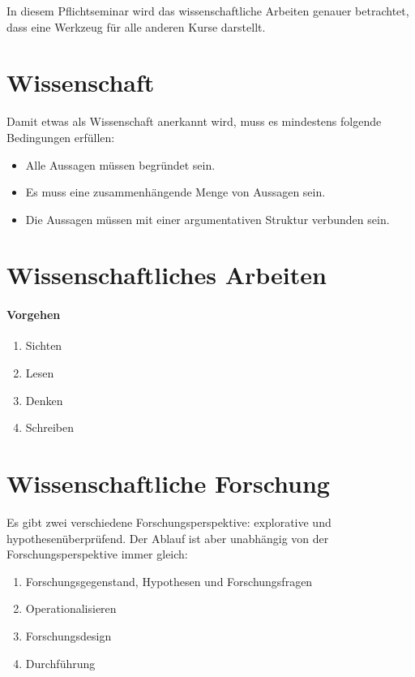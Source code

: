 \documentclass[../main.tex]{subfiles}
\begin{document}
    In diesem Pflichtseminar wird das wissenschaftliche Arbeiten genauer betrachtet, dass eine Werkzeug für alle anderen Kurse darstellt.
    \clearpage

    \section{Wissenschaft}
        Damit etwas als Wissenschaft anerkannt wird, muss es mindestens folgende Bedingungen erfüllen:
        
        \begin{itemize}
            \item Alle Aussagen müssen begründet sein.
            \item Es muss eine zusammenhängende Menge von Aussagen sein.
            \item Die Aussagen müssen mit einer argumentativen Struktur verbunden sein.
        \end{itemize}
        
    \section{Wissenschaftliches Arbeiten}
    
        \paragraph{Vorgehen}
        \begin{enumerate}
            \item Sichten
            \item Lesen
            \item Denken
            \item Schreiben
        \end{enumerate}
        
    \section{Wissenschaftliche Forschung}
        Es gibt zwei verschiedene Forschungsperspektive: explorative und hypothesenüberprüfend. Der Ablauf ist aber unabhängig von der Forschungsperspektive immer gleich:
    
        \begin{enumerate}
            \item Forschungsgegenstand, Hypothesen und Forschungsfragen
            \item Operationalisieren
            \item Forschungsdesign
            \item Durchführung
        \end{enumerate}
        
\end{document}
